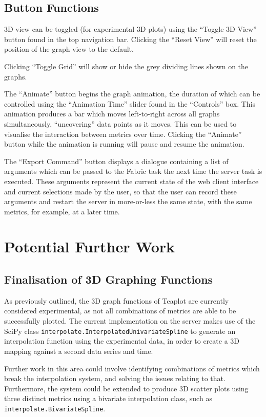 \documentclass[a4paper,twocolumn,english,11pt, a4paper, conference]{IEEEtran}
\begin{document}
\subsection{Button Functions}
3D view can be toggled (for experimental 3D plots) using the ``Toggle 3D View'' button found in the top navigation bar. Clicking the ``Reset View'' will reset the position of the graph view to the default. 

Clicking ``Toggle Grid'' will show or hide the grey dividing lines shown on the graphs.

The ``Animate'' button begins the graph animation, the duration of which can be controlled using the ``Animation Time'' slider found in the ``Controls'' box. This animation produces a bar which moves left-to-right across all graphs simultaneously, ``uncovering'' data points as it moves. This can be used to visualise the interaction between metrics over time. Clicking the ``Animate'' button while the animation is running will pause and resume the animation.

The ``Export Command'' button displays a dialogue containing a list of arguments which can be passed to the Fabric task the next time the server task is executed. These arguments represent the current state of the web client interface and current selections made by the user, so that the user can record these arguments and restart the server in more-or-less the same state, with the same metrics, for example, at a later time.
\section{Potential Further Work}
\label{sect:future}
\subsection{Finalisation of 3D Graphing Functions}
As previously outlined, the 3D graph functions of Teaplot are currently considered experimental, as not all combinations of metrics are able to be successfully plotted. The current implementation on the server makes use of the SciPy class \texttt{interpolate.InterpolatedUnivariateSpline} to generate an interpolation function using the experimental data, in order to create a 3D mapping against a second data series and time. 

Further work in this area could involve identifying combinations of metrics which break the interpolation system, and solving the issues relating to that. Furthermore, the system could be extended to produce 3D scatter plots using three distinct metrics using a bivariate interpolation class, such as \texttt{interpolate.BivariateSpline}.
\end{document}
